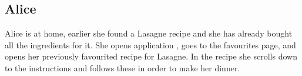 \subsection*{Alice}
Alice is at home, earlier she found a Lasagne recipe and she has already bought all the ingredients for it. She opens application \appname, goes to the favourites page, and opens her previously favourited recipe for Lasagne. In the recipe she scrolls down to the instructions and follows these in order to make her dinner.
